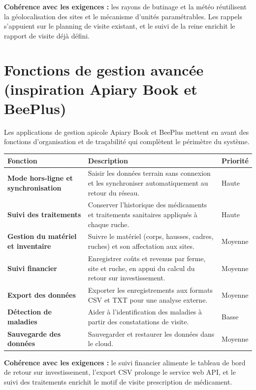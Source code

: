 \begin{encadre}
\textbf{Cohérence avec les exigences :} les rayons de butinage et la météo
réutilisent la géolocalisation des sites et le mécanisme d'unités paramétrables.
Les rappels s'appuient sur le planning de visite existant, et le suivi de la
reine enrichit le rapport de visite déjà défini.
\end{encadre}

\section{Fonctions de gestion avancée (inspiration Apiary Book et BeePlus)}
Les applications de gestion apicole Apiary Book et BeePlus mettent en avant des
fonctions d'organisation et de traçabilité qui complètent le périmètre du
système.
\begin{longtable}{>{\bfseries}p{4.2cm} p{7.5cm} C{2.1cm}}
\toprule
\textbf{Fonction} & \textbf{Description} & \textbf{Priorité} \\
\midrule
\endhead
Mode hors-ligne et synchronisation & Saisir les données terrain sans connexion et les synchroniser automatiquement au retour du réseau. & Haute \\
Suivi des traitements & Conserver l'historique des médicaments et traitements sanitaires appliqués à chaque ruche. & Haute \\
Gestion du matériel et inventaire & Suivre le matériel (corps, hausses, cadres, ruches) et son affectation aux sites. & Moyenne \\
Suivi financier & Enregistrer coûts et revenus par ferme, site et ruche, en appui du calcul du retour sur investissement. & Moyenne \\
Export des données & Exporter les enregistrements aux formats CSV et TXT pour une analyse externe. & Moyenne \\
Détection de maladies & Aider à l'identification des maladies à partir des constatations de visite. & Basse \\
Sauvegarde des données & Sauvegarder et restaurer les données dans le cloud. & Moyenne \\
\bottomrule
\end{longtable}
\begin{encadre}
\textbf{Cohérence avec les exigences :} le suivi financier alimente le tableau de
bord de retour sur investissement, l'export CSV prolonge le service web API, et
le suivi des traitements enrichit le motif de visite prescription de médicament.
\end{encadre}

